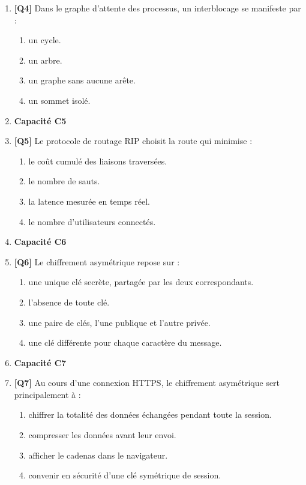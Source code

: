 \begin{enumerate}
\item \textbf{[Q4]} Dans le graphe d'attente des processus, un interblocage se manifeste par :
  \begin{enumerate}[label=\Alph*.]
    \item un cycle.
    \item un arbre.
    \item un graphe sans aucune arête.
    \item un sommet isolé.
  \end{enumerate}

\item[] \textbf{Capacité C5}

\item \textbf{[Q5]} Le protocole de routage RIP choisit la route qui minimise :
  \begin{enumerate}[label=\Alph*.]
    \item le coût cumulé des liaisons traversées.
    \item le nombre de sauts.
    \item la latence mesurée en temps réel.
    \item le nombre d'utilisateurs connectés.
  \end{enumerate}

\item[] \textbf{Capacité C6}

\item \textbf{[Q6]} Le chiffrement asymétrique repose sur :
  \begin{enumerate}[label=\Alph*.]
    \item une unique clé secrète, partagée par les deux correspondants.
    \item l'absence de toute clé.
    \item une paire de clés, l'une publique et l'autre privée.
    \item une clé différente pour chaque caractère du message.
  \end{enumerate}

\item[] \textbf{Capacité C7}

\item \textbf{[Q7]} Au cours d'une connexion HTTPS, le chiffrement asymétrique sert principalement à :
  \begin{enumerate}[label=\Alph*.]
    \item chiffrer la totalité des données échangées pendant toute la session.
    \item compresser les données avant leur envoi.
    \item afficher le cadenas dans le navigateur.
    \item convenir en sécurité d'une clé symétrique de session.
  \end{enumerate}

\end{enumerate}

